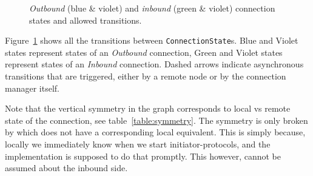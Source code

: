 \begin{figure}[p]
{}
  \caption{\textit{Outbound} (blue \& violet) and \textit{inbound} (green \&
  violet) connection states and allowed transitions.}
  \label{fig:statediagram}
\end{figure}

Figure~\ref{fig:statediagram} shows all the transitions between
\texttt{ConnectionState}s. Blue and Violet states represent states of
an \textit{Outbound} connection, Green and Violet states represent states of an
\textit{Inbound} connection. Dashed arrows indicate asynchronous
transitions that are triggered, either by a remote node or by the connection
manager itself.

Note that the vertical symmetry in the graph corresponds to local vs remote
state of the connection, see table~\ref{table:symmetry}. The symmetry is only
broken by \InboundIdleStateAny{} which does not have a corresponding
local equivalent. This is simply because, locally we immediately know when we
start initiator-protocols, and the implementation is supposed to do that
promptly. This however, cannot be assumed about the inbound side.


